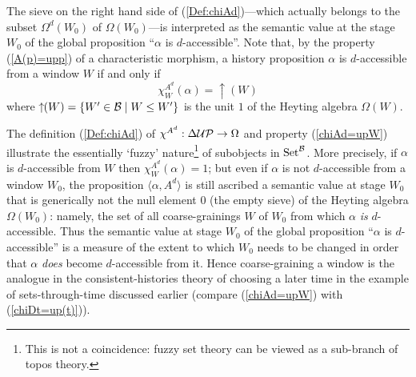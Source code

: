 \documentclass[12pt]{article}
\newcounter{def-number}[section]
\newcommand{\beq}{\begin{equation}}
\newcommand{\eeq}{\end{equation}}
\newcommand{\eq}[1]{(\ref{#1})}
\renewcommand{\a}{\alpha}                   %
\newcommand{\gp}[2]{\langle#1,#2\rangle}
\newcommand{\map}{\rightarrow}
\newcommand{\up}[1]{\uparrow\!\!(#1)}
\newcommand{\B}{{\cal B}}
\newcommand{\Om}{\Omega}
\newcommand{\UP}{{\cal UP}}
\newcommand{\Set}{{\rm Set}}
\newcommand{\SetB}{{\Set^{\cal B}}}
\begin{document}
	The sieve on the right hand side of \eq{Def:chiAd}---which actually
belongs to the subset $\Om^d(W_0)$ of $\Om(W_0)$---is interpreted as
the semantic value at the stage $W_0$ of the global proposition
``$\a$ is $d$-accessible''. Note that, by the property
\eq{A(p)=upp} of a characteristic morphism, a history
proposition $\a$ is $d$-accessible from a window $W$ if and only if
\beq
	\chi^{A^d}_{W}(\a)=\up{W} \label{chiAd=upW}
\eeq 
where $\up{W}=\{W'\in\B\mid W\leq W'\}$ is the unit $1$ of
the Heyting algebra $\Om(W)$.

	The definition \eq{Def:chiAd} of $\chi^{A^d}:\Delta\UP\map\Om$
and property \eq{chiAd=upW} illustrate the essentially `fuzzy'
nature\footnote{This is not a coincidence: fuzzy set theory can be
viewed as a sub-branch of topos theory.} of subobjects in $\SetB$.
More precisely, if $\a$ is $d$-accessible from $W$ then
$\chi^{A^d}_{W}(\a)=1$; but even if $\a$ is not $d$-accessible from
a window $W_0$, the proposition $\gp{\a}{A^d}$ is still ascribed a
semantic value at stage $W_0$ that is generically not the null
element $0$ (the empty sieve) of the Heyting algebra $\Om(W_0)$:
namely, the set of all coarse-grainings $W$ of $W_0$ from which $\a$
{\em is\/} $d$-accessible. Thus the semantic value at stage $W_0$ of
the global proposition ``$\a$ is $d$-accessible'' is a measure of
the extent to which $W_0$ needs to be changed in order that $\a$
{\em does\/} become $d$-accessible from it.  Hence coarse-graining a
window is the analogue in the consistent-histories theory of
choosing a later time in the example of sets-through-time discussed
earlier (compare
\eq{chiAd=upW} with
\eq{chiDt=up(t)}).
\end{document}
